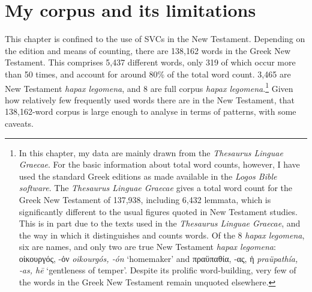 \documentclass[output=paper,colorlinks,citecolor=brown]{langscibook}
\begin{document}
\largerpage
\section{My corpus and its limitations}\label{my-corpus-and-its-limitationsCR}

This chapter is confined to the use of SVCs in the New Testament.
Depending on the edition and means of counting, there are 138,162 words
in the Greek New Testament. 
This comprises 5,437 different words, only
319 of which occur more than 50 times, and account for around 80\% of
the total word count. 
3,465 are New Testament \textit{hapax legomena}, and 8 are full
corpus \textit{hapax legomena}.\footnote{In this chapter, my data are mainly
  drawn from the \textit{Thesaurus Linguae Graecae}. 
For the basic information about total word counts,
  however, I have used the standard Greek editions as made available in
  the \textit{Logos Bible software}.
The \textit{Thesaurus Linguae Graecae} gives a total word count for the Greek New
  Testament of 137,938, including 6,432 lemmata, which is significantly
  different to the usual figures quoted in New Testament studies. 
This
  is in part due to the texts used in the \textit{Thesaurus Linguae Graecae}, and the way in which it
  distinguishes and counts words. Of the 8 \textit{hapax legomena}, six are
  names, and only two are true New Testament \textit{hapax legomena}: οἰκουργός, -ὀν \textit{oikourgós,
  ‑ón} ‘homemaker' and πραϋπαθία, ‑ας, ἡ \textit{praüpathía, ‑as, hē} ‘gentleness of temper'. 
Despite
  its prolific word-building, very few of the words in the Greek New
  Testament remain unquoted elsewhere.} 
Given how relatively few
frequently used words there are in the New Testament, that 138,162-word
corpus is large enough to analyse in terms of patterns, with some
caveats.~
\end{document}
